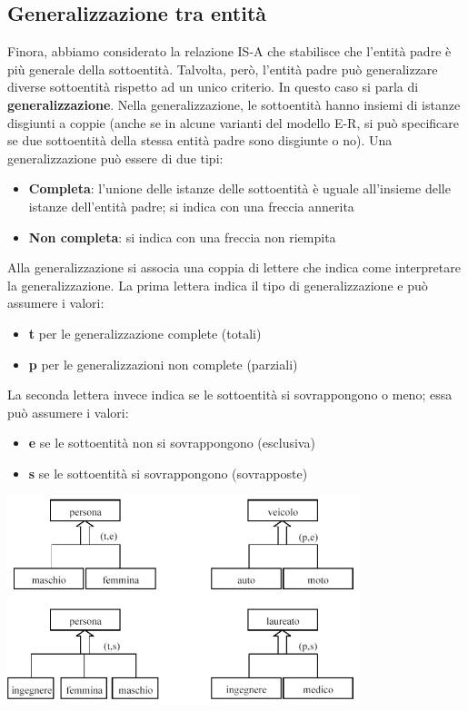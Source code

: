 \documentclass[12pt]{article}
\begin{document}
\subsection{Generalizzazione tra entità}
Finora, abbiamo considerato la relazione IS-A che stabilisce che l'entità padre è più generale della sottoentità.
Talvolta, però, l'entità padre può generalizzare diverse sottoentità rispetto ad un unico criterio. In questo caso si parla di \textbf{generalizzazione}.
Nella generalizzazione, le sottoentità hanno insiemi di istanze disgiunti a coppie (anche se in alcune varianti del modello E-R, si può specificare se due sottoentità della stessa entità padre sono disgiunte o no).
Una generalizzazione può essere di due tipi:
\begin{itemize}
    \item \textbf{Completa}: l'unione delle istanze delle sottoentità è uguale all'insieme delle istanze dell'entità padre; si indica con una freccia annerita
    \item \textbf{Non completa}: si indica con una freccia non riempita
\end{itemize}
Alla generalizzazione si associa una coppia di lettere che indica come interpretare la generalizzazione.
La prima lettera indica il tipo di generalizzazione e può assumere i valori:
\begin{itemize}
    \item \textbf{t} per le generalizzazione complete (totali)
    \item \textbf{p} per le generalizzazioni non complete (parziali)
\end{itemize}
\newpage
\noindent
La seconda lettera invece indica se le sottoentità si sovrappongono o meno; essa può assumere i valori:
\begin{itemize}
    \item \textbf{e} se le sottoentità non si sovrappongono (esclusiva)
    \item \textbf{s} se le sottoentità si sovrappongono (sovrapposte)
\end{itemize}
\begin{center}
    \includegraphics[width = 0.77\textwidth]{Images/37.PNG}
\end{center}
\end{document}
